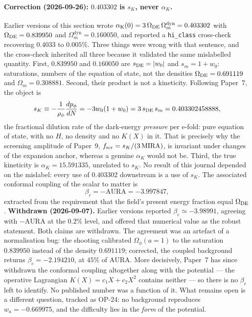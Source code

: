 \documentclass[a4paper,11pt]{article}
\begin{document}
\paragraph{Correction (2026-09-26): $0.403302$ is $s_K$, never $\alpha_K$.}
Earlier versions of this section wrote
$\alpha_{\rm K}(0)=3\,\Omega_{\rm DE}\,\Omega_m^{\mathrm{dyn}}=0.403302$ with
$\Omega_{\rm DE}=0.839950$ and $\Omega_m^{\mathrm{dyn}}=0.160050$, and reported a
\texttt{hi\_class} cross-check recovering $0.4033$ to $0.005\%$. Three things were
wrong with that sentence, and the cross-check inherited all three because it
validated the same mislabelled quantity. First, $0.839950$ and $0.160050$ are
$s_{\rm DE}=|w_0|$ and $s_m=1+w_0$: saturations, numbers of the equation of
state, not the densities $\Omega_{\rm DE}=0.691119$ and $\Omega_m=0.308881$.
Second, their product is not a kineticity. Following Paper~7, the object is
%
\begin{equation}
  s_K \equiv -\frac{1}{\rho_\phi}\frac{dp_\phi}{dN} = -3w_0(1+w_0)
      = 3\,s_{\rm DE}\,s_m = 0.403302458888 ,
  \label{eq:sK_sealed}
\end{equation}
%
the fractional dilution rate of the dark-energy \emph{pressure} per e-fold:
pure equation of state, with no $H$, no density and no $K(X)$ in it. That is
precisely why the screening amplitude of Paper~9, $f_{\rm scr}=s_K/(3\,\mathrm{MIRA})$,
is invariant under changes of the expansion anchor, whereas a genuine
$\alpha_K$ would not be. Third, the true kineticity is
$\alpha_K=15.591335$, unrelated to $s_K$. No result of this journal depended on
the mislabel: every use of $0.403302$ downstream is a use of $s_K$. The associated conformal coupling
of the scalar to matter is
\begin{equation}
  \label{eq:betac}
  \beta_c=-\mathrm{AURA}=-3.997847 ,
\end{equation}
extracted from the requirement that the field's present energy fraction equal
$\Omega_{\rm DE}$. \textbf{Withdrawn (2026-09-07).} Earlier versions reported
$\beta_c\simeq-3.98991$, agreeing with $-\mathrm{AURA}$ at the $0.2\%$ level,
and offered that numerical value as the robust statement. Both claims are
withdrawn. The agreement was an artefact of a normalisation bug: the shooting
calibrated $\Omega_\phi(a{=}1)$ to the saturation $0.839950$ instead of the
density $0.691119$; corrected, the coupled background returns
$\beta_c=-2.194210$, at $45\%$ of $\mathrm{AURA}$. More decisively, Paper~7
has since withdrawn the conformal coupling altogether along with the potential
--- the operative Lagrangian $K(X)=c_1X+c_2X^2$ contains neither --- so there
is no $\beta_c$ left to identify. No published number was a function of it.
What remains open is a different question, tracked as OP-24: no background
reproduces $w_a=-0.669975$, and the difficulty lies in the \emph{form} of the
potential.
\end{document}
